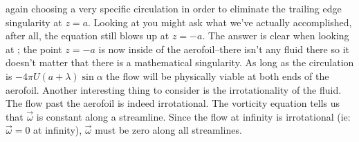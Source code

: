 \documentclass[12pt]{book}
\begin{document}
again choosing a very specific circulation
in order to eliminate the trailing edge singularity at $z=a$. Looking at  you might ask what we've actually accomplished, after all, the equation still blows up at $z=-a$.  The answer is clear when looking at ; the point $z=-a$ is now inside of the aerofoil--there isn't any fluid there so it doesn't matter that there is a mathematical singularity.  As long as the circulation is $-4\pi U(a+\lambda)\sin\alpha$ the flow will be physically viable at both ends of the aerofoil.  Another interesting thing to consider is the irrotationality of the fluid.  The flow past the aerofoil is indeed irrotational.  The vorticity equation
tells us that $\vec \omega$ is constant along a streamline.  Since the flow at infinity is irrotational (ie: $\vec \omega = 0$ at infinity), $\vec \omega$ must be zero along all streamlines.

\end{document}
